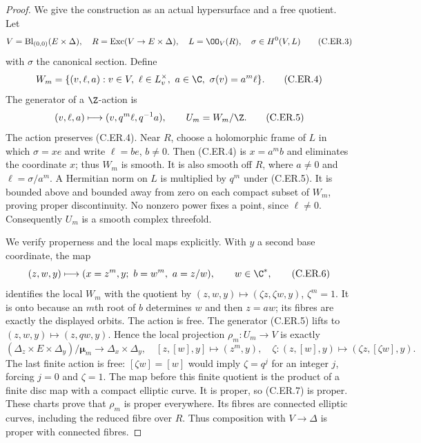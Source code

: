 \begin{proof}
We give the construction as an actual hypersurface and a free
quotient. Let
\[
 V=\operatorname{Bl}_{(0,0)}(E\times\Delta),\quad
 R=\operatorname{Exc}(V\to E\times\Delta),\quad
 L=\OO_V(R),\quad \sigma\in H^0(V,L)
                                                        \tag{C.ER.3}
\]
with $\sigma$ the canonical section. Define
\[
 W_m=\{(v,\ell,a):v\in V,\ \ell\in L_v^\times,\ a\in\C,
                         \ \sigma(v)=a^m\ell\}.
                                                        \tag{C.ER.4}
\]
The generator of a $\Z$-action is
\[
             (v,\ell,a)\longmapsto(v,q^m\ell,q^{-1}a),
 \qquad U_m=W_m/\Z.                               \tag{C.ER.5}
\]
The action preserves (C.ER.4). Near $R$, choose a holomorphic frame
of $L$ in which $\sigma=xe$ and write $\ell=be$, $b\ne0$.
Then (C.ER.4) is $x=a^m b$ and eliminates the coordinate $x$;
thus $W_m$ is smooth. It is also smooth off $R$, where $a\ne0$
and $\ell=\sigma/a^m$. A Hermitian norm on $L$ is multiplied by
$q^m$ under (C.ER.5). It is bounded above and bounded away from zero
on each compact subset of $W_m$, proving proper discontinuity.
No nonzero power fixes a point, since $\ell\ne0$. Consequently
$U_m$ is a smooth complex threefold.

We verify properness and the local maps explicitly. With $y$ a
second base coordinate, the map
\[
 (z,w,y)\longmapsto
 (x=z^m,y;\ b=w^m,\ a=z/w),\qquad w\in\C^*,
                                                        \tag{C.ER.6}
\]
identifies the local $W_m$ with the quotient by
$(z,w,y)\mapsto(\zeta z,\zeta w,y)$, $\zeta^m=1$.
It is onto because an $m$th root of $b$ determines $w$ and then
$z=aw$; its fibres are exactly the displayed orbits. The action is
free. The generator (C.ER.5) lifts to $(z,w,y)\mapsto(z,qw,y)$.
Hence the local projection $\rho_m:U_m\to V$ is exactly
\[
 (\Delta_z\times E\times\Delta_y)/\boldsymbol\mu_m
        \longrightarrow\Delta_x\times\Delta_y,
 \quad [z,[w],y]\longmapsto(z^m,y),
 \quad \zeta:(z,[w],y)\longmapsto(\zeta z,[\zeta w],y).
                                                        \tag{C.ER.7}
\]
The last finite action is free: $[\zeta w]=[w]$ would imply
$\zeta=q^j$ for an integer $j$, forcing $j=0$ and $\zeta=1$.
The map before this finite quotient is the product of a finite
disc map with a compact elliptic curve. It is proper, so (C.ER.7)
is proper. These charts prove that $\rho_m$ is proper everywhere.
Its fibres are connected elliptic curves, including the reduced
fibre over $R$. Thus composition with $V\to\Delta$ is proper
with connected fibres.


\end{proof}
